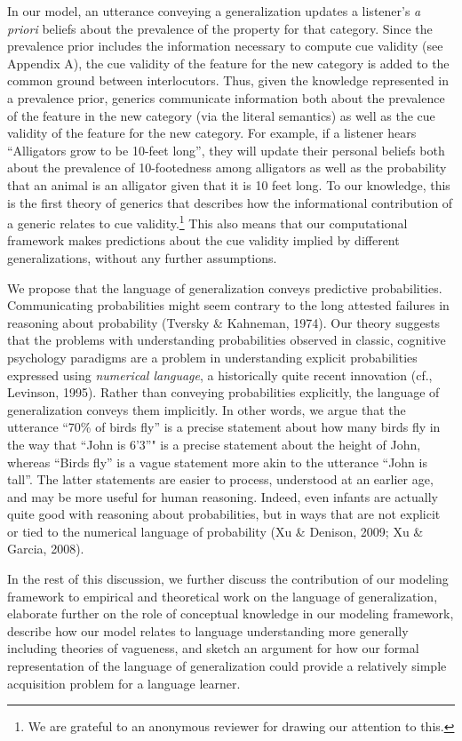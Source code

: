 \documentclass[english,,man,floatsintext]{apa6}
\let\rmarkdownfootnote\footnote%
\def\footnote{\protect\rmarkdownfootnote}
\theoremstyle{definition}
\theoremstyle{definition}
\theoremstyle{definition}
\theoremstyle{remark}
\begin{document}
In our model, an utterance conveying a generalization updates a
listener's \emph{a priori} beliefs about the prevalence of the property
for that category. Since the prevalence prior includes the information
necessary to compute cue validity (see Appendix A), the cue validity of
the feature for the new category is added to the common ground between
interlocutors. Thus, given the knowledge represented in a prevalence
prior, generics communicate information both about the prevalence of the
feature in the new category (via the literal semantics) as well as the
cue validity of the feature for the new category. For example, if a
listener hears \enquote{Alligators grow to be 10-feet long}, they will
update their personal beliefs both about the prevalence of 10-footedness
among alligators as well as the probability that an animal is an
alligator given that it is 10 feet long. To our knowledge, this is the
first theory of generics that describes how the informational
contribution of a generic relates to cue validity.\footnote{We are
  grateful to an anonymous reviewer for drawing our attention to this. }
This also means that our computational framework makes predictions about
the cue validity implied by different generalizations, without any
further assumptions.

We propose that the language of generalization conveys predictive
probabilities. Communicating probabilities might seem contrary to the
long attested failures in reasoning about probability (Tversky \&
Kahneman, 1974). Our theory suggests that the problems with
understanding probabilities observed in classic, cognitive psychology
paradigms are a problem in understanding explicit probabilities
expressed using \emph{numerical language}, a historically quite recent
innovation (cf., Levinson, 1995). Rather than conveying probabilities
explicitly, the language of generalization conveys them implicitly. In
other words, we argue that the utterance \enquote{70\% of birds fly} is
a precise statement about how many birds fly in the way that
\enquote{John is 6'3}" is a precise statement about the height of John,
whereas \enquote{Birds fly} is a vague statement more akin to the
utterance \enquote{John is tall}. The latter statements are easier to
process, understood at an earlier age, and may be more useful for human
reasoning. Indeed, even infants are actually quite good with reasoning
about probabilities, but in ways that are not explicit or tied to the
numerical language of probability (Xu \& Denison, 2009; Xu \& Garcia,
2008).

In the rest of this discussion, we further discuss the contribution of
our modeling framework to empirical and theoretical work on the language
of generalization, elaborate further on the role of conceptual knowledge
in our modeling framework, describe how our model relates to language
understanding more generally including theories of vagueness, and sketch
an argument for how our formal representation of the language of
generalization could provide a relatively simple acquisition problem for
a language learner.
\end{document}
